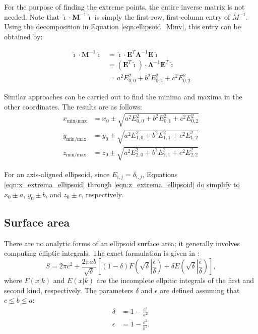 For the purpose of finding the extreme points, the entire inverse matrix is not needed. Note that $\bm{\hat{\imath}} \cdot \bm{M}^{-1} \bm{\hat{\imath}}$ is simply the first-row, first-column entry of $M^{-1}$. Using
the decomposition in Equation \ref{eqn:ellipsoid_Minv}, this entry can be obtained by:

\begin{align*}
    \bm{\hat{\imath}} \cdot \bm{M}^{-1} \bm{\hat{\imath}} &= \bm{\hat{\imath}} \cdot \bm{E}^T \bm{\Lambda}^{-1} \bm{E} \bm{\hat{\imath}} \\
    &= \left( \bm{E}^T \bm{\hat{\imath}}\right) \cdot \bm{\Lambda}^{-1} \bm{E}^T \bm{\hat{\imath}} \\
    &= a^2 E_{0,0}^2 + b^2 E_{0,1}^2 + c^2 E_{0,2}^2
\end{align*}

Similar approaches can be carried out to find the minima and maxima in the other coordinates. The results are as follows:
\begin{align}
    x_{\text{min}/\text{max}} &= x_0 \pm \sqrt{a^2 E_{0,0}^2 + b^2 E_{0,1}^2 + c^2 E_{0,2}^2} \label{eqn:x_extrema_ellipsoid} \\
    y_{\text{min}/\text{max}} &= y_0 \pm \sqrt{a^2 E_{1,0}^2 + b^2 E_{1,1}^2 + c^2 E_{1,2}^2} \\
    z_{\text{min}/\text{max}} &= z_0 \pm \sqrt{a^2 E_{2,0}^2 + b^2 E_{2,1}^2 + c^2 E_{2,2}^2} \label{eqn:z_extrema_ellipsoid}
\end{align}

For an axis-aligned ellipsoid, since $E_{i,j} = \delta_{i,j}$, Equations \ref{eqn:x_extrema_ellipsoid} through \ref{eqn:z_extrema_ellipsoid} do simplify to $x_0 \pm a$, $y_0 \pm b$, and $z_0 \pm c$, respectively.

\subsection{Surface area}
There are no analytic forms of an ellipsoid surface area; it generally involves computing elliptic integrals. The exact formulation is given in \cite{Tee2005SurfaceAO}:
\begin{equation}
    S = 2\pi c^2 + \frac{2\pi ab}{\sqrt{\delta}} \left[(1-\delta) F\left(\sqrt{\delta} \left| \frac{\epsilon}{\delta} \right.\right) + \delta E\left(\sqrt{\delta} \left| \frac{\epsilon}{\delta} \right.\right) \right],
\end{equation}
where $F(x|k)$ and $E(x|k)$ are the incomplete ellpitic integrals of the first and second kind, respectively. The parameters $\delta$ and $\epsilon$
are defined assuming that $c \leq b \leq a$:
\begin{align}
    \delta &= 1 - \frac{c^2}{a^2}\\
    \epsilon &= 1 - \frac{c^2}{b^2}.
\end{align}

